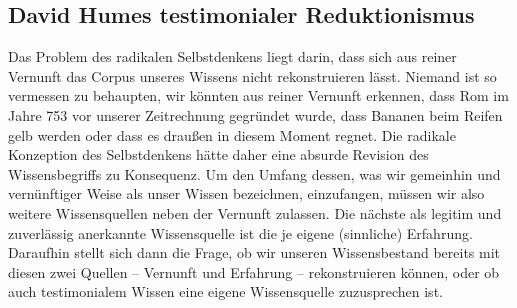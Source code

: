 \subsection{David Humes testimonialer Reduktionismus}
\label{subsubsection:DavidHume}
Das Problem des radikalen Selbstdenkens liegt darin, dass sich aus reiner
Vernunft das Corpus unseres Wissens nicht rekonstruieren lässt. Niemand ist so
vermessen zu behaupten, wir könnten aus reiner Vernunft
erkennen, dass Rom im Jahre 753 vor unserer Zeitrechnung gegründet wurde, dass Bananen
beim Reifen gelb werden oder dass es draußen in diesem Moment regnet. Die
radikale Konzeption des Selbstdenkens hätte daher eine absurde Revision des
Wissensbegriffs zu Konsequenz. Um den Umfang dessen, was wir gemeinhin und
vernünftiger Weise als unser Wissen bezeichnen, einzufangen, müssen wir also
weitere Wissensquellen neben der Vernunft zulassen. Die nächste als legitim und
zuverlässig anerkannte Wissensquelle ist die je eigene (sinnliche) Erfahrung.
Daraufhin stellt sich dann die Frage, ob wir unseren Wissensbestand bereits mit
diesen zwei Quellen -- Vernunft und Erfahrung -- rekonstruieren können, oder ob auch testimonialem
Wissen eine eigene Wissensquelle zuzusprechen ist.

